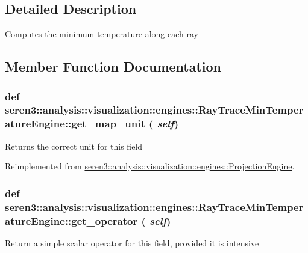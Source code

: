 \subsection{Detailed Description}
\begin{DoxyVerb}
Computes the minimum temperature along each ray
\end{DoxyVerb}
 

\subsection{Member Function Documentation}
\hypertarget{classseren3_1_1analysis_1_1visualization_1_1engines_1_1RayTraceMinTemperatureEngine_ae0cd2459819fa5df91728a1a74e91f45}{
\subsubsection[{get\_\-map\_\-unit}]{\setlength{\rightskip}{0pt plus 5cm}def seren3::analysis::visualization::engines::RayTraceMinTemperatureEngine::get\_\-map\_\-unit ( {\em self})}}
\label{classseren3_1_1analysis_1_1visualization_1_1engines_1_1RayTraceMinTemperatureEngine_ae0cd2459819fa5df91728a1a74e91f45}
\begin{DoxyVerb}
Returns the correct unit for this field
\end{DoxyVerb}
 

Reimplemented from \hyperlink{classseren3_1_1analysis_1_1visualization_1_1engines_1_1ProjectionEngine_a2009db840c6f340e3c39d21dc81a3b77}{seren3::analysis::visualization::engines::ProjectionEngine}.\hypertarget{classseren3_1_1analysis_1_1visualization_1_1engines_1_1RayTraceMinTemperatureEngine_aec7ecf391ca54f86f96c840f62785a8e}{
\subsubsection[{get\_\-operator}]{\setlength{\rightskip}{0pt plus 5cm}def seren3::analysis::visualization::engines::RayTraceMinTemperatureEngine::get\_\-operator ( {\em self})}}
\label{classseren3_1_1analysis_1_1visualization_1_1engines_1_1RayTraceMinTemperatureEngine_aec7ecf391ca54f86f96c840f62785a8e}
\begin{DoxyVerb}
Return a simple scalar operator for this field, provided it is intensive
\end{DoxyVerb}
 

